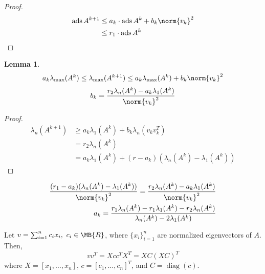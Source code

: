 \documentclass[nobib]{my-handout}
\newtheorem{lemma}{Lemma}
\begin{document}
\begin{proof}
	\begin{equation*}
		\begin{aligned}
			\operatorname{ads}A^{k+1}
			&\le a_k \cdot \operatorname{ads} A^k + b_k \norm{v_k}^2 \\
			&\le r_1 \cdot \operatorname{ads} A^k
		\end{aligned}
	\end{equation*}
\end{proof}

\begin{lemma}
	\begin{equation*}
		a_k \lambda_{\max}(A^k) \le \lambda_{\max}(A^{k+1}) \le a_k
		\lambda_{\max}(A^k) + b_k \norm{v_k}^2
	\end{equation*}
	\begin{equation*}
		b_k = \frac{r_2 \lambda_n(A^k) - a_k \lambda_1(A^k)}{\norm{v_k}^2}
	\end{equation*}
\end{lemma}

\begin{proof}
	\begin{equation*}
		\begin{aligned}
			\lambda_n(A^{k+1})
			&\ge a_k \lambda_1(A^k) + b_k \lambda_n(v_k v_k^T) \\
			&=r_2 \lambda_n(A^k)\\
			&= a_k \lambda_1(A^k) + (r - a_k)(\lambda_n(A^k) - \lambda_1(A^k))
		\end{aligned}
	\end{equation*}
\end{proof}
	
\begin{equation*}
	\begin{aligned}
		\frac{(r_1 - a_k) (\lambda_n(A^k) - \lambda_1(A^k))}{\norm{v_k}^2} = \frac{r_2
		\lambda_n(A^k) - a_k \lambda_1(A^k)}{\norm{v_k}^2}\\
		a_k = \frac{r_1 \lambda_n(A^k) - r_1 \lambda_1(A^k) - r_2
		\lambda_n(A^k)}{\lambda_n(A^k) - 2\lambda_1(A^k)}
	\end{aligned}
\end{equation*}

Let $v = \sum_{i=1}^n c_i x_i,\ c_i \in \MB{R}$, where $\{x_i\}_{i=1}^n$ are
normalized eigenvectors of $A$. Then,
\begin{equation*}
	v v^T = X c c^T X^T = X C (X C)^T
\end{equation*}
where $X = [x_1, \dotsc, x_n]$, $c = [c_1, \dotsc, c_n]^T$, and $C =
\operatorname{diag}(c)$.
\end{document}
